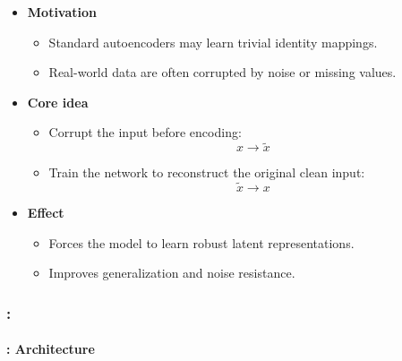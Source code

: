 \documentclass[xcolor=table]{beamer}
\begin{document}
	\begin{subsectionframe}
		\begin{itemize}
			
			\item \textbf{Motivation}
			\begin{itemize}
				\item Standard autoencoders may learn trivial identity mappings.
				\item Real-world data are often corrupted by noise or missing values.
			\end{itemize}
			
			\item \textbf{Core idea}
			\begin{itemize}
				\item Corrupt the input before encoding:
				\[
				x \rightarrow \tilde{x}
				\]
				\item Train the network to reconstruct the original clean input:
				\[
				\tilde{x} \rightarrow x
				\]
			\end{itemize}
			
			\item \textbf{Effect}
			\begin{itemize}
				\item Forces the model to learn robust latent representations.
				\item Improves generalization and noise resistance.
			\end{itemize}
			
		\end{itemize}
	\end{subsectionframe}
	
	\begin{frame}
		\frametitle{\insertshortsubtitle: \insertsection}
		\framesubtitle{\insertsubsection: Architecture}
		
		
	\end{frame}
	
\end{document}
